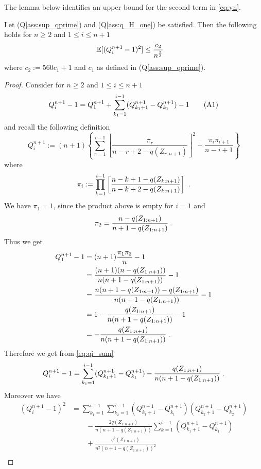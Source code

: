 %
The lemma below identifies an upper bound for the second term in \eqref{eq:yn}.
\begin{lemma} \label{lem:qisquare_upper_bound} 
	Let (Q\ref{ass:sup_qprime})  and (Q\ref{ass:q_H_one}) be satisfied. Then the following holds for $n\geq 2$ and $1\leq i\leq n+1$ 
	\begin{align*}
		\mathbb{E}[(Q_i^{n+1} - 1)^2] &\leq \frac{c_2}{n^\frac{7}{3}}
	\end{align*}
	where $c_2:= 560 c_1 + 1$ and $c_1$ as defined in (Q\ref{ass:sup_qprime}). 
	\begin{proof}
		Consider for $n\geq 2$ and $1\leq i\leq n+1$
		\begin{equation*}
			Q_i^{n+1} - 1 = Q_1^{n+1} + \sum_{k_1=1}^{i-1} (Q_{k_1+1}^{n+1} - Q_{k_1}^{n+1}) - 1 \numberthis \label{eq:qi_sum}
		\end{equation*}
		and recall the following definition
		$$Q_i^{n+1} := (n+1)\left\{\sum_{r=1}^{i-1}\left[\frac{\pi_r}{n-r+2-q(Z_{r:n+1})}\right]^2 + \frac{\pi_i \pi_{i+1}}{n-i+1} \right\}$$
		where
		$$\pi_i := \prod_{k=1}^{i-1} \left[\frac{n-k+1-q(Z_{k:n+1})}{n-k+2-q(Z_{k:n+1})}\right]\textrm{ .}$$
		We have $\pi_1 = 1$, since the product above is empty for $i=1$ and 
		$$\pi_2 = \frac{n-q(Z_{1:n+1})}{n+1-q(Z_{1:n+1})}\textrm{ .}$$ 
		Thus we get
		\begin{align*}
			Q_1^{n+1} - 1 &= (n+1)\frac{\pi_1 \pi_2}{n} - 1\\
			&= \frac{(n+1)(n-q(Z_{1:n+1}))}{n(n+1-q(Z_{1:n+1}))} - 1\\
			&= \frac{n(n+1-q(Z_{1:n+1}))-q(Z_{1:n+1})}{n(n+1-q(Z_{1:n+1}))} - 1\\
			&= 1 - \frac{q(Z_{1:n+1})}{n(n+1-q(Z_{1:n+1}))} - 1\\
			&= -\frac{q(Z_{1:n+1})}{n(n+1-q(Z_{1:n+1}))}\textrm{ .}
		\end{align*}
		Therefore we get from \eqref{eq:qi_sum} 
		\begin{equation*}
			Q_i^{n+1} - 1 = \sum_{k_1=1}^{i-1} (Q_{k_1+1}^{n+1} - Q_{k_1}^{n+1}) - \frac{q(Z_{1:n+1})}{n(n+1-q(Z_{1:n+1}))}\textrm{ .}
		\end{equation*}
		Moreover we have 
		\begin{align*}
			(Q_i^{n+1} - 1)^2 &= \sum_{k_1=1}^{i-1}\sum_{k_2=1}^{i-1}(Q_{k_1+1}^{n+1} - Q_{k_1}^{n+1})(Q_{k_2+1}^{n+1} - Q_{k_2}^{n+1})\\
			&\qquad - \frac{2q(Z_{1:n+1})}{n(n+1-q(Z_{1:n+1}))} \sum_{k=1}^{i-1}(Q_{k_1+1}^{n+1} - Q_{k_1}^{n+1})\\
			&\qquad + \frac{q^2(Z_{1:n+1})}{n^2(n+1-q(Z_{1:n+1}))^2}\\

\end{align*}
\end{proof}
\end{lemma}
